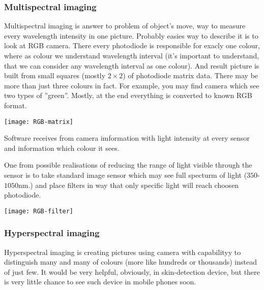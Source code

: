         \subsubsection*{Multispectral imaging}
            Multispectral imaging is answer to
            problem of object's move,
            way to measure every wavelength intensity in one picture.
            Probably easies way to describe it is to look at RGB camera.
            There every photodiode is responsible for exacly one colour,
            where as colour we understand wavelength interval (it's important
            to understand, that we can consider any wavelength interval as one colour).
            And result picture is built from small squares (mostly $2 \times 2$)
            of photodiode matrix data.
            There may be more than just  three colours in fact.
            For example, you may find camera which see two types of ''green''.
            Mostly, at the end everything is converted to known RGB format.

            \begin{center}
                \texttt{[image: RGB-matrix]}
            \end{center}

            Software receives from camera imformation with light intensity at every
            sensor and information which colour it sees. 

            One from possible realisations of reducing the range
            of light visible through the sensor is to take standard image sensor which
            may see full specturm of light ($350$-$1050$nm.) and
            place filters in way that only specific light will reach choosen photodiode.

            \begin{center}
                \texttt{[image: RGB-filter]}
            \end{center}

        \subsubsection*{Hyperspectral imaging}
            Hyperspectral imaging is creating pictures using camera with
            capabilityy to distinguish many and many of colours (more like hundreds or thousands)
            instead of just few.
            It would be very helpful, obviously, in skin-detection device,
            but there is very little chance to see such device in mobile phones soon.

